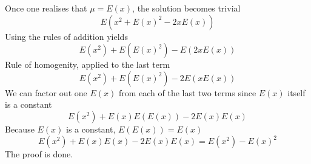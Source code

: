 \documentclass[10pt,a4paper]{article}
\begin{document}
Once one realises that $\mu = E(x)$, the solution becomes trivial
\begin{equation}
  E(x^2 + E(x)^2 - 2xE(x))
\end{equation}
Using the rules of addition yields
\begin{equation}
  E(x^2) + E(E(x)^2) - E(2xE(x))
\end{equation}
Rule of homogenity, applied to the last term
\begin{equation}
  E(x^2) + E(E(x)^2) - 2E(xE(x))
\end{equation}
We can factor out one $E(x)$ from each of the last two terms since
$E(x)$ itself is a constant
\begin{equation}
  E(x^2) + E(x)E(E(x)) - 2E(x)E(x)
\end{equation}
Because $E(x)$ is a constant, $E(E(x)) = E(x)$
\begin{equation}
  E(x^2) + E(x)E(x) - 2E(x)E(x) = E(x^2) - E(x)^2
\end{equation}
The proof is done.
\end{document}
